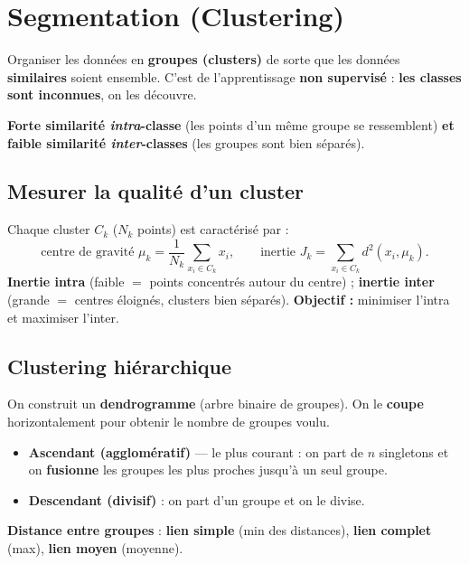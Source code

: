 \chapter{Segmentation (Clustering)}

\begin{Definition}[Clustering]
Organiser les données en \textbf{groupes (clusters)} de sorte que les données
\textbf{similaires} soient ensemble. C'est de l'apprentissage \textbf{non supervisé} :
\textbf{les classes sont inconnues}, on les découvre.
\end{Definition}

\begin{Astuce}
\textbf{Forte similarité \emph{intra}-classe} (les points d'un même groupe se ressemblent)
\textbf{et faible similarité \emph{inter}-classes} (les groupes sont bien séparés).
\end{Astuce}

\section{Mesurer la qualité d'un cluster}
Chaque cluster $C_k$ ($N_k$ points) est caractérisé par :
\[ \text{centre de gravité } \mu_k=\frac{1}{N_k}\sum_{x_i\in C_k} x_i, \qquad
   \text{inertie } J_k=\sum_{x_i\in C_k} d^2(x_i,\mu_k). \]
\textbf{Inertie intra} (faible $=$ points concentrés autour du centre) ; \textbf{inertie inter}
(grande $=$ centres éloignés, clusters bien séparés). \textbf{Objectif :} minimiser l'intra et
maximiser l'inter.

\section{Clustering hiérarchique}
On construit un \textbf{dendrogramme} (arbre binaire de groupes). On le \textbf{coupe}
horizontalement pour obtenir le nombre de groupes voulu.
\begin{itemize}[leftmargin=1.4em,nosep]
  \item \textbf{Ascendant (agglomératif)} — le plus courant : on part de $n$ singletons et on
        \textbf{fusionne} les groupes les plus proches jusqu'à un seul groupe.
  \item \textbf{Descendant (divisif)} : on part d'un groupe et on le divise.
\end{itemize}
\textbf{Distance entre groupes} : \textbf{lien simple} (min des distances), \textbf{lien complet}
(max), \textbf{lien moyen} (moyenne).

